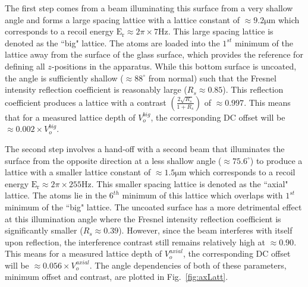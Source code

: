 The first step comes from a beam illuminating this surface from a very shallow angle and forms a large spacing lattice with a lattice constant of $\approx 9.2 \mathrm{\mu m}$ which corresponds to a recoil energy $\mathrm{E_r} \approx 2 \pi \times 7 \mathrm{Hz}$. This large spacing lattice is denoted as the ``big" lattice. The atoms are loaded into the $1^{st}$ minimum of the lattice away from the surface of the glass surface, which provides the reference for defining all $z$-positions in the apparatus. While this bottom surface is uncoated, the angle is sufficiently shallow ($\approx 88^\circ$ from normal) such that the Fresnel intensity reflection coefficient is reasonably large ($R_s\approx 0.85$). This reflection coefficient produces a lattice with a contrast $\left ( \frac{2 \sqrt{R_s}}{1 + R_s}\right )$ of $\approx 0.997$. This means that for a measured lattice depth of $V_o^{big}$, the corresponding DC offset will be $\approx 0.002 \times V_o^{big}$.

The second step involves a hand-off with a second beam that illuminates the surface from the opposite direction at a less shallow angle ($\approx 75.6^\circ$) to produce a lattice with a smaller lattice constant of $\approx 1.5 \mathrm{\mu m}$ which corresponds to a recoil energy $\mathrm{E_r} \approx 2 \pi \times 255\mathrm{Hz}$. This smaller spacing lattice is denoted as the ``axial" lattice. The atoms lie in the $6^{th}$ minimum of this lattice which overlaps with $1^{st}$ minimum of the ``big" lattice. The uncoated surface has a more detrimental effect at this illumination angle where the Fresnel intensity reflection coefficient is significantly smaller ($R_s \approx 0.39$). However, since the beam interferes with itself upon reflection, the interference contrast still remains relatively high at $\approx 0.90$. This means for a measured lattice depth of $V_o^{axial}$, the corresponding DC offset will be $\approx 0.056 \times V_o^{axial}$. The angle dependencies of both of these parameters, minimum offset and contrast, are plotted in Fig.~\ref{fig:axLatt}.

